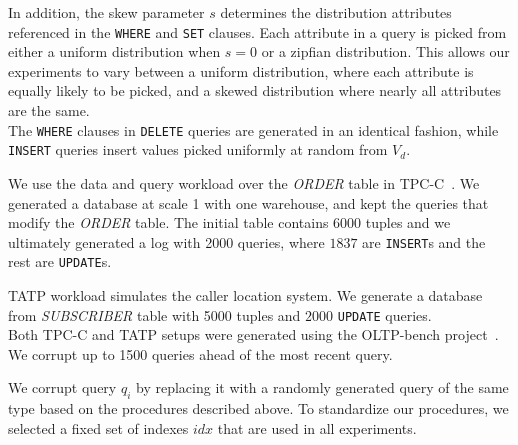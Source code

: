 % 
In addition, the skew parameter $s$ determines the distribution attributes referenced in the \texttt{WHERE} and \texttt{SET} clauses.  
Each attribute in a query is picked from either a uniform distribution when $s=0$ or a zipfian distribution.
This allows our experiments to vary between a uniform distribution, where each attribute is
equally likely to be picked, and a skewed distribution where nearly all attributes are the same. \\
The \texttt{WHERE} clauses in \texttt{DELETE} queries are generated in an identical fashion, while
\texttt{INSERT} queries insert values picked uniformly at random from $V_d$.

 We use the data and query workload over the {\it ORDER} table in TPC-C~\cite{tpcc}.  
We generated a database at scale 1 with one warehouse, and kept the queries that modify the
{\it ORDER} table. The initial table contains 6000 tuples and we ultimately generated a log with
2000 queries, where $1837$ are \texttt{INSERT}s and the rest are \texttt{UPDATE}s. 

 TATP workload simulates the 
caller location system. We generate a database from {\it SUBSCRIBER} table
with 5000 tuples and $2000$ \texttt{UPDATE} queries.\\
Both TPC-C and TATP setups were generated using the OLTP-bench project~\cite{difallah2013oltp}. 
We corrupt up to 1500 queries ahead of the most recent query.  



 We corrupt query $q_i$ by replacing it with a randomly
generated query of the same type based on the procedures described above.
To standardize our procedures, we selected a fixed set of indexes $idx$
that are used in all experiments.  






